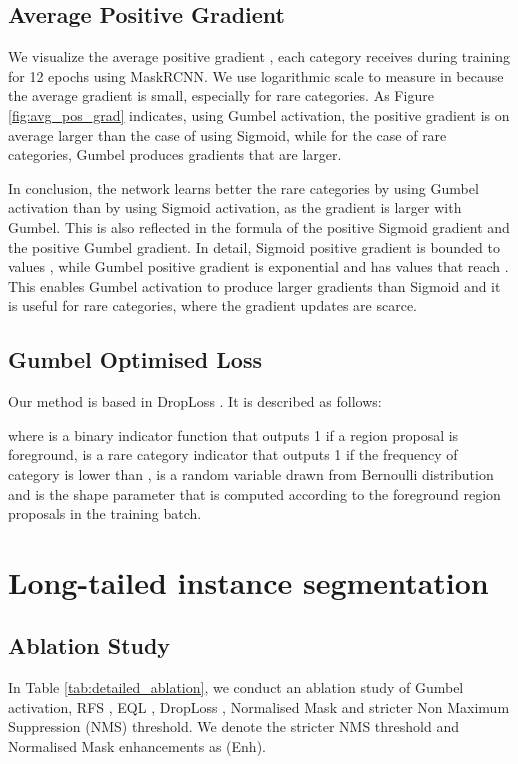 \documentclass[runningheads]{llncs}
\begin{document}
\subsection{Average Positive Gradient}
We visualize the average positive gradient , each category receives during training for 12 epochs using MaskRCNN. We use logarithmic scale to measure  in  because the average gradient is small, especially for rare categories. As Figure \ref{fig:avg_pos_grad} indicates, using Gumbel activation, the positive gradient is on average  larger than the case of using Sigmoid, while for the case of rare categories, Gumbel produces gradients that are  larger. 




In conclusion, the network learns better the rare categories by using Gumbel activation than by using Sigmoid activation, as the gradient is larger with Gumbel. This is also reflected in the formula of the positive Sigmoid gradient and the positive Gumbel gradient.
In detail, Sigmoid positive gradient is bounded to values , while Gumbel positive gradient is exponential and has values that reach . This enables Gumbel activation to produce larger gradients than Sigmoid and it is useful for rare categories, where the gradient updates are scarce.

\subsection{Gumbel Optimised Loss}
Our  method is based in DropLoss \cite{hsieh2021droploss}. It is described as follows:



where  is a binary indicator function that outputs 1 if a region proposal  is foreground,  is a rare category indicator that outputs 1 if the frequency of category  is lower than ,  is a random variable drawn from Bernoulli distribution and  is the shape parameter that is computed according to the foreground region proposals in the training batch.



\section{Long-tailed instance segmentation}
\label{sec:ltis_supp}
\subsection{Ablation Study}
\label{sec:ablation_studies}
In Table \ref{tab:detailed_ablation}, we conduct an ablation study of Gumbel activation, RFS \cite{gupta2019lvis}, EQL \cite{tan2020equalization}, DropLoss \cite{hsieh2021droploss}, Normalised Mask \cite{wang2021seesaw} and stricter Non Maximum Suppression (NMS) threshold. We denote the stricter NMS threshold and Normalised Mask enhancements as (Enh).
\end{document}
